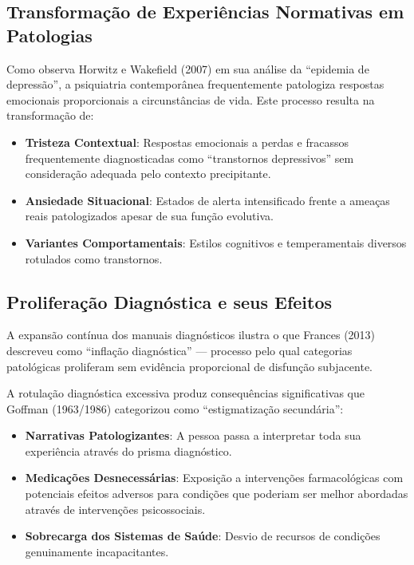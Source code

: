 \subsection{Transformação de Experiências Normativas em Patologias}

Como observa Horwitz e Wakefield (2007) em sua análise da \enquote{epidemia de depressão}, a psiquiatria contemporânea frequentemente patologiza respostas emocionais proporcionais a circunstâncias de vida. Este processo resulta na transformação de:

\begin{itemize}
\item \textbf{Tristeza Contextual}: Respostas emocionais a perdas e fracassos frequentemente diagnosticadas como \enquote{transtornos depressivos} sem consideração adequada pelo contexto precipitante.

\item \textbf{Ansiedade Situacional}: Estados de alerta intensificado frente a ameaças reais patologizados apesar de sua função evolutiva.

\item \textbf{Variantes Comportamentais}: Estilos cognitivos e temperamentais diversos rotulados como transtornos.
\end{itemize}

\subsection{Proliferação Diagnóstica e seus Efeitos}

A expansão contínua dos manuais diagnósticos ilustra o que Frances (2013) descreveu como \enquote{inflação diagnóstica} --- processo pelo qual categorias patológicas proliferam sem evidência proporcional de disfunção subjacente.

A rotulação diagnóstica excessiva produz consequências significativas que Goffman (1963/1986) categorizou como \enquote{estigmatização secundária}:

\begin{itemize}
\item \textbf{Narrativas Patologizantes}: A pessoa passa a interpretar toda sua experiência através do prisma diagnóstico.

\item \textbf{Medicações Desnecessárias}: Exposição a intervenções farmacológicas com potenciais efeitos adversos para condições que poderiam ser melhor abordadas através de intervenções psicossociais.

\item \textbf{Sobrecarga dos Sistemas de Saúde}: Desvio de recursos de condições genuinamente incapacitantes.
\end{itemize}

